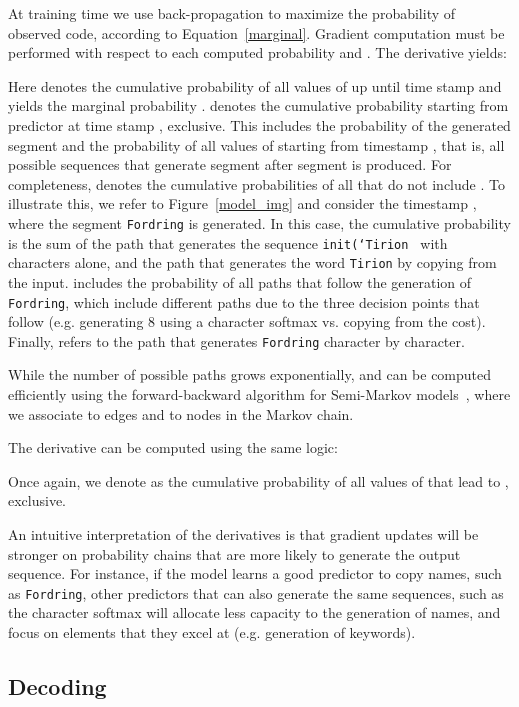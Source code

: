 \documentclass[11pt]{article}
\begin{document}
At training time we use back-propagation to maximize the probability of observed code, according to Equation~\ref{marginal}. Gradient computation must be performed with respect to each computed probability  and . The derivative  yields:

Here  denotes the cumulative probability of all values of 
up until time stamp  and  yields the marginal
probability .  denotes the cumulative probability
starting from predictor  at time stamp , exclusive. This includes the probability of the generated segment  and the probability of all values of  starting from timestamp , that is, all possible sequences that generate segment  after segment  is produced. For
completeness,  denotes the cumulative probabilities of all 
that do not include . To illustrate this, we refer to Figure~\ref{model_img} and consider the timestamp , where the segment \texttt{Fordring} is generated. In this case, the cumulative probability  is the sum of the path that generates the sequence \texttt{init(`Tirion } with characters alone, and the path that generates the word \texttt{Tirion} by copying from the input.  includes the probability of all paths that follow the generation of \texttt{Fordring}, which include  different paths due to the three decision points that follow (e.g. generating 8 using a character softmax vs. copying from the cost). Finally,  refers to the path that generates \texttt{Fordring} character by character.

While the number of possible paths grows exponentially,  and  can be computed
efficiently using the forward-backward algorithm for Semi-Markov
models~\cite{NIPS2004_2648}, where we associate  to edges and  to nodes in the
Markov chain. 

The derivative  can be computed using the same logic:



Once again, we denote  as the cumulative probability of all values of  that lead to , exclusive.

An intuitive interpretation of the derivatives is that gradient updates will be stronger on probability chains that are more likely to generate the output sequence. For instance, if the model learns a good predictor to copy names, such as \texttt{Fordring}, other predictors that can also generate the same sequences, such as the character softmax will allocate less capacity to the generation of names, and focus on elements that they excel at (e.g. generation of keywords).

\subsection{Decoding}
\end{document}
